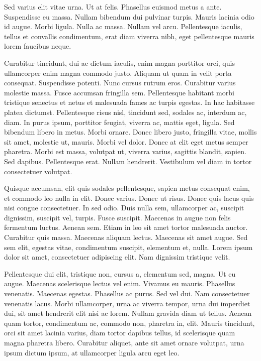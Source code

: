 Sed varius elit vitae urna. Ut at felis. Phasellus euismod metus a ante. Suspendisse eu massa. Nullam bibendum dui pulvinar turpis. Mauris lacinia odio id augue. Morbi ligula. Nulla ac massa. Nullam vel arcu. Pellentesque iaculis, tellus et convallis condimentum, erat diam viverra nibh, eget pellentesque mauris lorem faucibus neque.

Curabitur tincidunt, dui ac dictum iaculis, enim magna porttitor orci, quis ullamcorper enim magna commodo justo. Aliquam ut quam in velit porta consequat. Suspendisse potenti. Nunc cursus rutrum eros. Curabitur varius molestie massa. Fusce accumsan fringilla sem. Pellentesque habitant morbi tristique senectus et netus et malesuada fames ac turpis egestas. In hac habitasse platea dictumst. Pellentesque risus nisl, tincidunt sed, sodales ac, interdum ac, diam. In purus ipsum, porttitor feugiat, viverra ac, mattis eget, ligula. Sed bibendum libero in metus. Morbi ornare. Donec libero justo, fringilla vitae, mollis sit amet, molestie ut, mauris. Morbi vel dolor. Donec at elit eget metus semper pharetra. Morbi est massa, volutpat ut, viverra varius, sagittis blandit, sapien. Sed dapibus. Pellentesque erat. Nullam hendrerit. Vestibulum vel diam in tortor consectetuer volutpat.

Quisque accumsan, elit quis sodales pellentesque, sapien metus consequat enim, et commodo leo nulla in elit. Donec varius. Donec ut risus. Donec quis lacus quis nisi congue consectetuer. In sed odio. Duis nulla sem, ullamcorper ac, suscipit dignissim, suscipit vel, turpis. Fusce suscipit. Maecenas in augue non felis fermentum luctus. Aenean sem. Etiam in leo sit amet tortor malesuada auctor. Curabitur quis massa. Maecenas aliquam lectus. Maecenas sit amet augue. Sed sem elit, egestas vitae, condimentum suscipit, elementum et, nulla. Lorem ipsum dolor sit amet, consectetuer adipiscing elit. Nam dignissim tristique velit.

Pellentesque dui elit, tristique non, cursus a, elementum sed, magna. Ut eu augue. Maecenas scelerisque lectus vel enim. Vivamus eu mauris. Phasellus venenatis. Maecenas egestas. Phasellus ac purus. Sed vel dui. Nam consectetuer venenatis lacus. Morbi ullamcorper, urna ac viverra tempor, urna dui imperdiet dui, sit amet hendrerit elit nisi ac lorem. Nullam gravida diam ut tellus. Aenean quam tortor, condimentum ac, commodo non, pharetra in, elit. Mauris tincidunt, orci sit amet lacinia varius, diam tortor dapibus tellus, id scelerisque quam magna pharetra libero. Curabitur aliquet, ante sit amet ornare volutpat, urna ipsum dictum ipsum, at ullamcorper ligula arcu eget leo.

